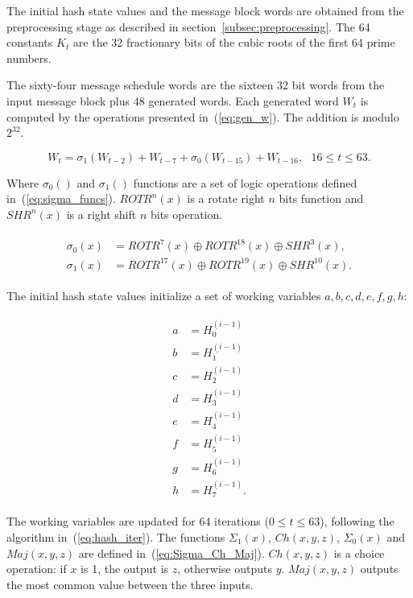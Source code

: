 The initial hash state values and the message block words are obtained from the 
preprocessing stage as described in section~\ref{subsec:preprocessing}.
The 64 constants $K_{t}$ are the 32 fractionary bits of the cubic roots of the
first 64 prime numbers.

The sixty-four message schedule words are the sixteen 32 bit words from the
input message block plus 48 generated words. Each generated word $W_{t}$ is
computed by the operations presented in~(\ref{eq:gen_w}). The addition is
modulo $2^{32}$.

\begin{equation}
    W_{t} = \sigma_{1}(W_{t-2}) + W_{t-7} + \sigma_{0}(W_{t-15}) + W_{t-16}, \ \ \ 16 \leq t \leq 63.
\label{eq:gen_w}
\end{equation}

Where $\sigma_{0}()$ and $\sigma_{1}()$ functions are a set of logic operations
defined in~(\ref{eq:sigma_funcs}). $ROTR^{n}(x)$ is a rotate right $n$ bits
function and $SHR^{n}(x)$ is a right shift $n$ bits operation.

\begin{align}
    \begin{split}
        \sigma_{0}(x) &= ROTR^{7}(x) \oplus ROTR^{18}(x) \oplus SHR^{3}(x), \\
        \sigma_{1}(x) &= ROTR^{17}(x) \oplus ROTR^{19}(x) \oplus SHR^{10}(x).
    \end{split}
\label{eq:sigma_funcs}
\end{align}

The initial hash state values initialize a set of working variables $a, b, c,
d, e, f, g, h$:

\begin{align}
    \begin{split}
        a &= H_{0}^{(i-1)} \\
        b &= H_{1}^{(i-1)} \\
        c &= H_{2}^{(i-1)} \\
        d &= H_{3}^{(i-1)} \\
        e &= H_{4}^{(i-1)} \\
        f &= H_{5}^{(i-1)} \\
        g &= H_{6}^{(i-1)} \\
        h &= H_{7}^{(i-1)}.
    \end{split}
\label{eq:init_state}
\end{align}

The working variables are updated for 64 iterations ($ 0 \leq t \leq 63$),
following the algorithm in~(\ref{eq:hash_iter}). The functions $\Sigma_1(x)$,
$Ch(x,y,z)$, $\Sigma_0(x)$ and $Maj(x,y,z)$ are defined
in~(\ref{eq:Sigma_Ch_Maj}). $Ch(x,y,z)$ is a choice operation: if $x$ is 1, the
output is $z$, otherwise outputs $y$. $Maj(x,y,z)$ outputs the most common
value between the three inputs.

